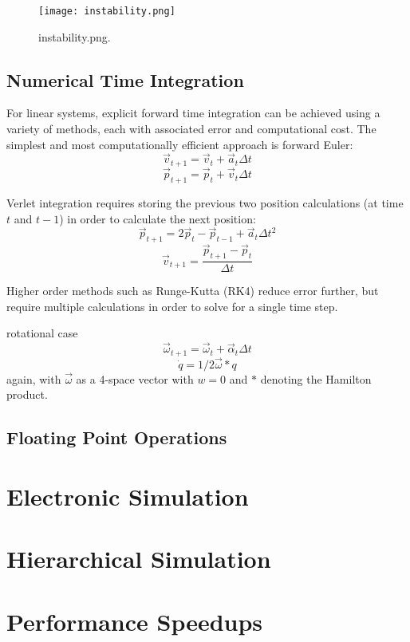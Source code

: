 {\begin{figure}
  \texttt{[image: instability.png]}
  \caption{instability.png.}
  \label{fig:instability}
\end{figure}

\subsection{Numerical Time Integration}

For linear systems, explicit forward time integration can be achieved using a variety of methods, each with associated error and computational cost.  The simplest and most computationally efficient approach is forward Euler:
\[ \vec{v}_{t+1} = \vec{v}_{t} +  \vec{a}_{t}\Delta t\]
\[ \vec{p}_{t+1} = \vec{p}_{t} +  \vec{v}_{t}\Delta t\]

Verlet integration requires storing the previous two position calculations (at time $t$ and $t-1$) in order to calculate the next position:
\[ \vec{p}_{t+1} = 2\vec{p}_{t} - \vec{p}_{t-1} +  \vec{a}_{t}\Delta t^2\]
\[ \vec{v}_{t+1} = \dfrac{\vec{p}_{t+1} - \vec{p}_{t}}{\Delta t}\]

Higher order methods such as Runge-Kutta (RK4) reduce error further, but require multiple calculations in order to solve for a single time step.

rotational case
\[ \vec{\omega}_{t+1} = \vec{\omega}_{t} +  \vec{\alpha}_{t}\Delta t\]
\[ \dot{q} = 1/2\vec{\omega}*q\]
again, with $\vec{\omega}$ as a 4-space vector with $w=0$ and $*$ denoting the Hamilton product.

\subsection{Floating Point Operations}

\section{Electronic Simulation}\label{sec:electronicSim}

\section{Hierarchical Simulation}

\section{Performance Speedups}

}
